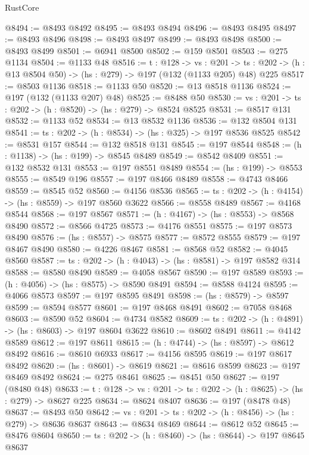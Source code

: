 \begin{lexlean}{RustCore}
\begin{coremodule}
@8494 := @8493 @8492
@8495 := @8493 @8494
@8496 := @8493 @8495
@8497 := @8493 @8496
@8498 := @8493 @8497
@8499 := @8493 @8498
@8500 := @8493 @8499
@8501 := @6941 @8500
@8502 := @159 @8501
@8503 := @275 @1134
@8504 := @1133 @48
@8516 := {t : @128} ->
  {vs : @201} ->
  {ts : @202} -> (h : @13 @8504 @50) -> (hs : @279) -> @197 (@132 (@1133 @205) @48) @225
@8517 := @8503 @1136
@8518 := @1133 @50
@8520 := @13 @8518 @1136
@8524 := @197 (@132 (@1133 @207) @48)
@8525 := @8488 @50
@8530 := {vs : @201} -> {ts : @202} -> (h : @8520) -> (hs : @279) -> @8524 @8525
@8531 := @8517 @131
@8532 := @1133 @52
@8534 := @13 @8532 @1136
@8536 := @132 @8504 @131
@8541 := {ts : @202} -> (h : @8534) -> (hs : @325) -> @197 @8536 @8525
@8542 := @8531 @157
@8544 := @132 @8518 @131
@8545 := @197 @8544
@8548 := (h : @1138) -> (hs : @199) -> @8545 @8489
@8549 := @8542 @8409
@8551 := @132 @8532 @131
@8553 := @197 @8551 @8489
@8554 := (hs : @199) -> @8553
@8555 := @8549 @196
@8557 := @197 @8466 @8489
@8558 := @4743 @8466
@8559 := @8545 @52
@8560 := @4156 @8536
@8565 := {ts : @202} -> (h : @4154) -> (hs : @8559) -> @197 @8560 @3622
@8566 := @8558 @8489
@8567 := @4168 @8544
@8568 := @197 @8567
@8571 := (h : @4167) -> (hs : @8553) -> @8568 @8490
@8572 := @8566 @4725
@8573 := @4176 @8551
@8575 := @197 @8573 @8490
@8576 := (hs : @8557) -> @8575
@8577 := @8572 @8555
@8579 := @197 @8467 @8490
@8580 := @4226 @8467
@8581 := @8568 @52
@8582 := @4045 @8560
@8587 := {ts : @202} -> (h : @4043) -> (hs : @8581) -> @197 @8582 @314
@8588 := @8580 @8490
@8589 := @4058 @8567
@8590 := @197 @8589
@8593 := (h : @4056) -> (hs : @8575) -> @8590 @8491
@8594 := @8588 @4124
@8595 := @4066 @8573
@8597 := @197 @8595 @8491
@8598 := (hs : @8579) -> @8597
@8599 := @8594 @8577
@8601 := @197 @8468 @8491
@8602 := @7058 @8468
@8603 := @8590 @52
@8604 := @4734 @8582
@8609 := {ts : @202} -> (h : @4891) -> (hs : @8603) -> @197 @8604 @3622
@8610 := @8602 @8491
@8611 := @4142 @8589
@8612 := @197 @8611
@8615 := (h : @4744) -> (hs : @8597) -> @8612 @8492
@8616 := @8610 @6933
@8617 := @4156 @8595
@8619 := @197 @8617 @8492
@8620 := (hs : @8601) -> @8619
@8621 := @8616 @8599
@8623 := @197 @8469 @8492
@8624 := @275 @8461
@8625 := @8451 @50
@8627 := @197 (@8480 @48)
@8633 := {t : @128} -> {vs : @201} -> {ts : @202} -> (h : @8625) -> (hs : @279) -> @8627 @225
@8634 := @8624 @8407
@8636 := @197 (@8478 @48)
@8637 := @8493 @50
@8642 := {vs : @201} -> {ts : @202} -> (h : @8456) -> (hs : @279) -> @8636 @8637
@8643 := @8634 @8469
@8644 := @8612 @52
@8645 := @8476 @8604
@8650 := {ts : @202} -> (h : @8460) -> (hs : @8644) -> @197 @8645 @8637

\end{coremodule}
\end{lexlean}
